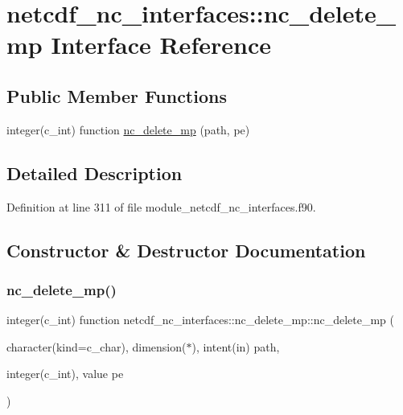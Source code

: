 \hypertarget{interfacenetcdf__nc__interfaces_1_1nc__delete__mp}{}\section{netcdf\+\_\+nc\+\_\+interfaces\+:\+:nc\+\_\+delete\+\_\+mp Interface Reference}
\label{interfacenetcdf__nc__interfaces_1_1nc__delete__mp}
\subsection*{Public Member Functions}
\begin{DoxyCompactItemize}
\item 
integer(c\+\_\+int) function \hyperlink{interfacenetcdf__nc__interfaces_1_1nc__delete__mp_ae36b6cf6ea55dd3fd0fc1dd6e1020c02}{nc\+\_\+delete\+\_\+mp} (path, pe)
\end{DoxyCompactItemize}


\subsection{Detailed Description}


Definition at line 311 of file module\+\_\+netcdf\+\_\+nc\+\_\+interfaces.\+f90.



\subsection{Constructor \& Destructor Documentation}
\mbox{\label{interfacenetcdf__nc__interfaces_1_1nc__delete__mp_ae36b6cf6ea55dd3fd0fc1dd6e1020c02}} 
\subsubsection{\texorpdfstring{nc\+\_\+delete\+\_\+mp()}{nc\_delete\_mp()}}
{\footnotesize\ttfamily integer(c\+\_\+int) function netcdf\+\_\+nc\+\_\+interfaces\+::nc\+\_\+delete\+\_\+mp\+::nc\+\_\+delete\+\_\+mp (\begin{DoxyParamCaption}\item[{character(kind=c\+\_\+char), dimension($\ast$), intent(in)}]{path,  }\item[{integer(c\+\_\+int), value}]{pe }\end{DoxyParamCaption})}



